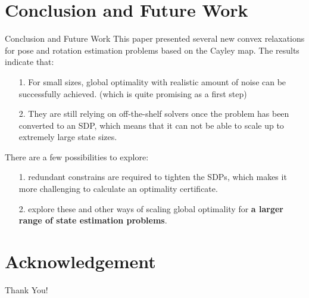 \documentclass[8pt]{beamer}
\begin{document}
\section{Conclusion and Future Work}
\begin{frame}{Conclusion and Future Work}
This paper presented several new convex relaxations for pose and rotation estimation problems based on the Cayley map. The results indicate that:
\begin{itemize}
    \item[1.] For small sizes, global optimality with realistic amount of noise can be successfully achieved. (which is quite promising as a first step)
    \item[2.] They are still relying on off-the-shelf solvers once the problem has been converted to an SDP, which means that it can not be able to scale up to extremely large state sizes.
\end{itemize}
\vspace{1em}
There are a few possibilities to explore:
\begin{itemize}
    \item[1.] redundant constrains are required to tighten the SDPs, which makes it more challenging to calculate an optimality certificate.
    \item[2.] explore these and other ways of scaling global optimality for \textbf{a larger range of state estimation problems}. 
\end{itemize}
\end{frame}

\section*{Acknowledgement}  
\begin{frame}
\centering
\textcolor{myNewColorA}{\fontsize{40pt}{50pt}\selectfont Thank You!}
\end{frame}
\end{document}
